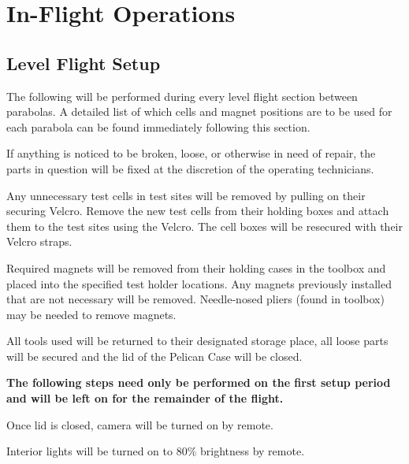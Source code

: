 \newpage{}
\section{In-Flight Operations}
\subsection{Level Flight Setup}
The following will be performed during every level flight section between
parabolas.  A detailed list of which cells and magnet positions
are to be used for each parabola can be found immediately following this
section.
\begin{checklist}
    \item If anything is noticed to be broken, loose, or otherwise in need of repair, the parts in question will be fixed at the discretion of the operating technicians.
    \item Any unnecessary test cells in test sites will be removed by pulling on their securing Velcro.  Remove the new test cells from their holding boxes and attach them to the test sites using the Velcro.  The cell boxes will be resecured with their Velcro straps.
    \item Required magnets will be removed from their holding cases in the toolbox and placed into the specified test holder locations. Any magnets previously installed that are not necessary will be removed.  Needle-nosed pliers (found in toolbox) may be needed to remove magnets.
    \item All tools used will be returned to their designated storage place, all loose parts will be secured and the lid of the Pelican Case will be closed.
\end{checklist}
\textbf{The following steps need only be performed on the first setup period and will be left on for the remainder of the flight.}
\begin{checklist}
    \item Once lid is closed, camera will be turned on by remote.
    \item Interior lights will be turned on to 80\% brightness by remote.
\end{checklist}

